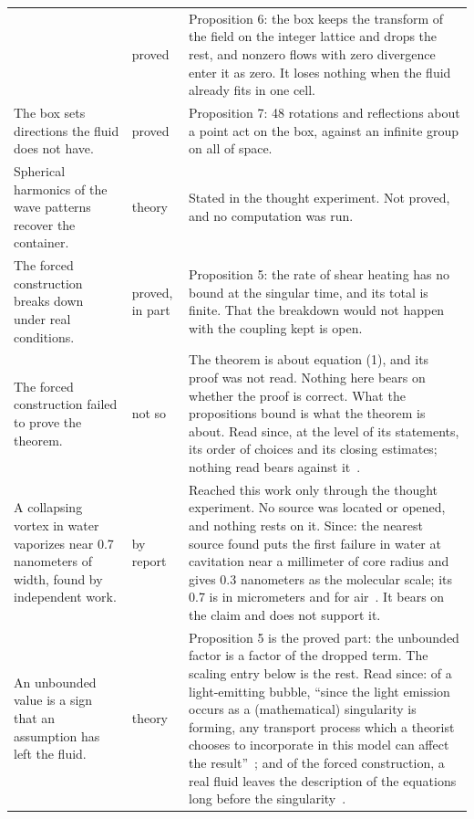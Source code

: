\begin{longtable}{@{}>{\raggedright\arraybackslash}p{}>{\raggedright\arraybackslash}p{}>{\raggedright\arraybackslash}p{}@{}}
& proved
& Proposition 6: the box keeps the transform of the field on the integer lattice and drops the
rest, and nonzero flows with zero divergence enter it as zero. It loses nothing when the fluid
already fits in one cell. \\[0.6em]
The box sets directions the fluid does not have.
& proved
& Proposition 7: 48 rotations and reflections about a point act on the box, against an infinite
group on all of space. \\[0.6em]
Spherical harmonics of the wave patterns recover the container.
& theory
& Stated in the thought experiment. Not proved, and no computation was run. \\[0.6em]
The forced construction breaks down under real conditions.
& proved, in part
& Proposition 5: the rate of shear heating has no bound at the singular time, and its total is
finite. That the breakdown would not happen with the coupling kept is open. \\[0.6em]
The forced construction failed to prove the theorem.
& not so
& The theorem is about equation (1), and its proof was not read. Nothing here bears on whether
the proof is correct. What the propositions bound is what the theorem is about. Read since, at the
level of its statements, its order of choices and its closing estimates; nothing read bears
against it~\cite{src:OpenAI-2026-Navier-Stokes}. \\[0.6em]
A collapsing vortex in water vaporizes near 0.7 nanometers of width, found by independent work.
& by report
& Reached this work only through the thought experiment. No source was located or opened, and
nothing rests on it. Since: the nearest source found puts the first failure in water at
cavitation near a millimeter of core radius and gives 0.3 nanometers as the molecular scale; its
0.7 is in micrometers and for air~\cite{src:Duraiswami-2026}. It bears on the claim and does not
support it. \\[0.6em]
An unbounded value is a sign that an assumption has left the fluid.
& theory
& Proposition 5 is the proved part: the unbounded factor is a factor of the dropped term. The
scaling entry below is the rest. Read since: of a light-emitting bubble, ``since the light emission
occurs as a (mathematical) singularity is forming, any transport process which a theorist chooses
to incorporate in this model can affect the result''~\cite{src:Barber-1997}; and of the forced
construction, a real fluid leaves the description of the equations long before the
singularity~\cite{src:Duraiswami-2026}. \\
\end{longtable}

